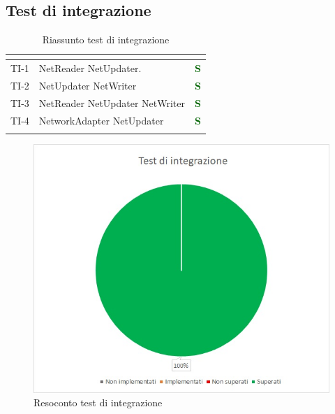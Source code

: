 \subsection{Test di integrazione}
\normalsize
\renewcommand{\arraystretch}{1}
\begin{longtable}{|C{2.5cm}|C{4.5cm}|C{2.5cm}|}
	\hline
	\textbf{\color{title_text}{Test}} & \textbf{\color{title_text}{Componenti}} & \textbf{\color{title_text}{Stato}} \\
	\hline
	\endhead
	{TI-1} & NetReader NetUpdater. & \textcolor{darkgreen}{\textbf{S}}\\
	\hline
	{TI-2} & NetUpdater NetWriter & \textcolor{darkgreen}{\textbf{S}}\\
	\hline
	{TI-3} & NetReader \newline NetUpdater \newline NetWriter & \textcolor{darkgreen}{\textbf{S}}\\
	\hline
	{TI-4} & NetworkAdapter NetUpdater & \textcolor{darkgreen}{\textbf{S}}\\
	\hline
	\caption{Riassunto test di integrazione}
	\label{tabella:riassunto ti}
\end{longtable}
\renewcommand{\arraystretch}{1}
\begin{figure} [H]
	\centering
	\includegraphics[scale=1]{Img/TI}
	\caption{Resoconto test di integrazione}\label{}
\end{figure}
\newpage


